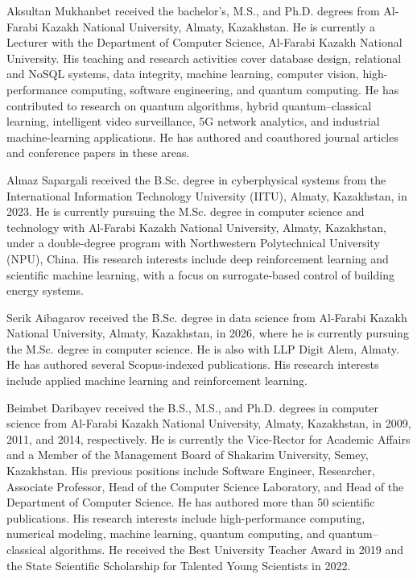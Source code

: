\begin{IEEEbiographynophoto}{Aksultan Mukhanbet}
received the bachelor's, M.S., and Ph.D. degrees from Al-Farabi Kazakh National
University, Almaty, Kazakhstan. He is currently a Lecturer with the Department
of Computer Science, Al-Farabi Kazakh National University. His teaching and
research activities cover database design, relational and NoSQL systems, data
integrity, machine learning, computer vision, high-performance computing,
software engineering, and quantum computing. He has contributed to research on
quantum algorithms, hybrid quantum--classical learning, intelligent video
surveillance, 5G network analytics, and industrial machine-learning
applications. He has authored and coauthored journal articles and conference
papers in these areas.
\end{IEEEbiographynophoto}

\begin{IEEEbiographynophoto}{Almaz Sapargali}
received the B.Sc. degree in cyberphysical systems from the International
Information Technology University (IITU), Almaty, Kazakhstan, in 2023. He is
currently pursuing the M.Sc. degree in computer science and technology with
Al-Farabi Kazakh National University, Almaty, Kazakhstan, under a double-degree
program with Northwestern Polytechnical University (NPU), China. His research
interests include deep reinforcement learning and scientific machine learning,
with a focus on surrogate-based control of building energy systems.
\end{IEEEbiographynophoto}

\begin{IEEEbiographynophoto}{Serik Aibagarov}
received the B.Sc. degree in data science from Al-Farabi Kazakh National
University, Almaty, Kazakhstan, in 2026, where he is currently pursuing the
M.Sc. degree in computer science. He is also with LLP Digit Alem, Almaty. He
has authored several Scopus-indexed publications. His research interests
include applied machine learning and reinforcement learning.
\end{IEEEbiographynophoto}

\begin{IEEEbiographynophoto}{Beimbet Daribayev}
received the B.S., M.S., and Ph.D. degrees in computer science from Al-Farabi
Kazakh National University, Almaty, Kazakhstan, in 2009, 2011, and 2014,
respectively. He is currently the Vice-Rector for Academic Affairs and a Member
of the Management Board of Shakarim University, Semey, Kazakhstan. His previous
positions include Software Engineer, Researcher, Associate Professor, Head of
the Computer Science Laboratory, and Head of the Department of Computer
Science. He has authored more than 50 scientific publications. His research
interests include high-performance computing, numerical modeling, machine
learning, quantum computing, and quantum--classical algorithms. He received the
Best University Teacher Award in 2019 and the State Scientific Scholarship for
Talented Young Scientists in 2022.
\end{IEEEbiographynophoto}

